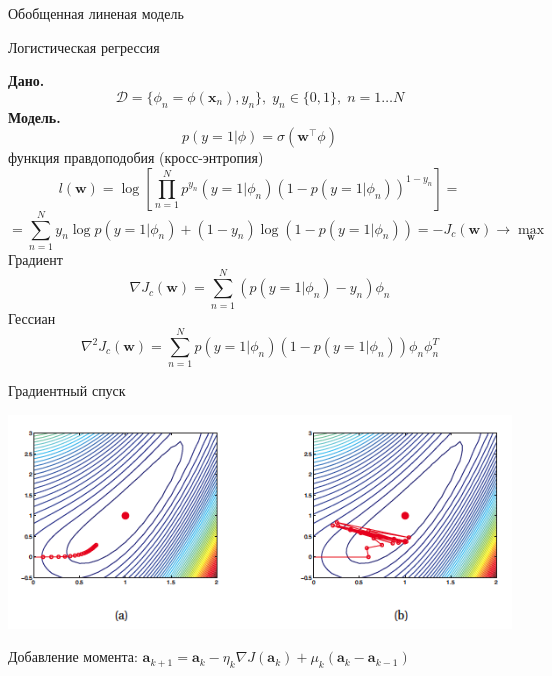 \documentclass[10pt]{beamer}
\begin{document}
\begin{frame}{Обобщенная линеная модель}
\end{frame}

\begin{frame}{Логистическая регрессия}

{\bf Дано.}
\[
\mathcal{D} = \{\phi_n = \phi(\mathbf{x}_n), y_n\}, \; y_n \in \{ 0,1\}, \; n = 1 \ldots N
\]
{\bf Модель.}
\[
p(y=1 | \phi) = \sigma(\mathbf{w}^\top \phi)
\]
функция правдоподобия (кросс-энтропия)
\[
l(\mathbf{w}) = \log \left[ \prod_{n=1}^N p^{y_n}(y=1 | \phi_n) (1 - p(y=1 | \phi_n))^{1 - y_n}\right] = 
\]
\[
= \sum_{n=1}^N {y_n \log p(y=1 | \phi_n) + (1- y_n) \log (1 - p(y=1 | \phi_n))} = - J_c(\mathbf{w}) \rightarrow \max_{\mathbf{w}}
\]
Градиент
\[
\nabla J_c(\mathbf{w}) = \sum_{n=1}^N (p(y=1 | \phi_n) - y_n) \phi_n
\]
Гессиан
\[
\nabla^2 J_c(\mathbf{w}) = \sum_{n=1}^N p(y=1 | \phi_n) (1 - p(y=1 | \phi_n)) \phi_n \phi_n^T
\]

\end{frame}


\begin{frame}{Градиентный спуск}

	\gd

	\begin{center}
   		\includegraphics[scale=0.4]{images/gd.png}   		
    \end{center}
    
    Добавление момента: $\mathbf{a}_{k+1} = \mathbf{a}_k - \eta_k \nabla J (\mathbf{a}_k) + \mu_k (\mathbf{a}_{k} - \mathbf{a}_{k-1})$

\end{frame}

\end{document}
